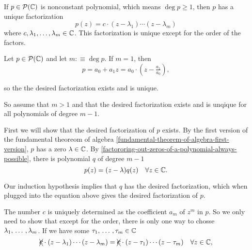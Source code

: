 \begin{thm} 
  \label{fundamental-theorem-of-algebra-second-version}
  If $p \in \mathcal{P}(\mathbb{C})$ is nonconstant polynomial, which means $\deg p \geq 1$, then $p$ has a unique factorization
  \begin{equation}
  	p(z)=c \cdot (z-\lambda_1) \cdots (z-\lambda_m)
  \end{equation}
  where $c, \lambda_1, \dots, \lambda_m \in \mathbb{C}$. This factorization is unique except for the order of the factors.
\end{thm}
\begin{prf}
  Let $p \in \mathcal{P}(\mathbb{C})$ and let $m :\equiv \deg p$. If $m = 1$, then
  \[
    p = a_0 + a_1 z = a_0 \cdot \left(z-\tfrac{a_1}{a_0} \right),
  \]

  so the the desired factorization exists and is unique.

  So assume that $m > 1$ and that the desired factorization exists and is unqique for all polynomials of degree $m-1$.

  First we will show that the desired factorization of $p$ exists. By the first version of the fundamental theoreom of algebra \ref{fundamental-theorem-of-algebra-first-version}, $p$ has a zero $\lambda \in \mathbb{C}$. By \ref{factororing-out-zeros-of-a-polynomial-always-possible}, there is polynomial $q$ of degree $m-1$ \st
  \[
    p(z) = (z-\lambda) q(z) \quad \forall z \in \mathbb{C}.
  \]

  Our induction hypothesis implies that $q$ has the desired factorization, which when plugged into the equation above gives the desired factorization of $p$.

   The number $c$ is uniquely determined as the coefficient $a_m$ of $z^m$ in $p$. So we only need to show that except for the order, there is only one way to chosse $\lambda_1, {\, \ldots \,\,}, \lambda_m$. If we have some $\tau_1, {\, \ldots \,\,}, \tau_m \in \mathbb{C}$ \st
  \begin{equation}
    \xcancel{\mathlarger{c}} \cdot (z - \lambda_1) \cdots (z-\lambda_m) = \xcancel{\mathlarger{c}} \cdot (z-\tau_1) \cdots (z-\tau_m) \quad \forall z \in \compl,
  \end{equation}



\end{prf}
